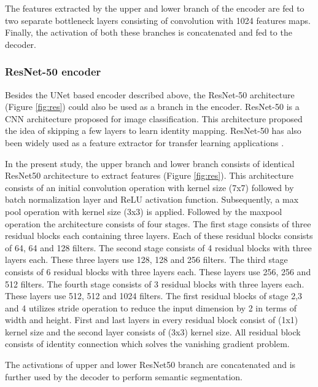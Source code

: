 \documentclass[journal]{IEEEtran}
\begin{document}
The features extracted by the upper and lower branch of the encoder are fed to two separate bottleneck layers consisting of  convolution with 1024 features maps. Finally, the activation of both these branches is concatenated and fed to the decoder.



\subsubsection{ResNet-50 encoder}
\label{resnet} 
Besides the UNet based encoder described above, the ResNet-50 architecture (Figure \ref{fig:res}) could also be used as a branch in the encoder.  ResNet-50 is a CNN architecture proposed for image classification. This architecture proposed the idea of skipping a few layers to learn identity mapping.  ResNet-50 has also been widely used as a feature extractor for transfer learning applications \cite{he2016deep}.

In the present study, the upper branch and lower branch consists of identical ResNet50 architecture to extract features (Figure \ref{fig:res}). This architecture consists of an initial convolution operation with kernel size (7x7)  followed by batch normalization layer and ReLU activation function. Subsequently, a max pool operation with kernel size (3x3) is applied. Followed by the maxpool operation the architecture consists of four stages. The first stage consists of three residual blocks each containing three layers. Each of these residual blocks consists of 64, 64 and 128 filters. The second stage consists of 4 residual blocks with three layers each. These three layers use 128, 128 and 256 filters. The third stage consists of 6 residual blocks with three layers each. These layers use 256, 256 and 512 filters. The fourth stage consists of 3 residual blocks with three layers each. These layers use 512, 512 and 1024 filters. The first residual blocks of stage 2,3 and 4 utilizes stride operation to reduce the input dimension by 2 in terms of width and height. First and last layers in every residual block consist of (1x1) kernel size and the second layer consists of (3x3) kernel size. All residual block consists of identity connection which solves the vanishing gradient problem. 



The activations of upper and lower ResNet50 branch are concatenated and is further used by the decoder to perform semantic segmentation.   
\end{document}
